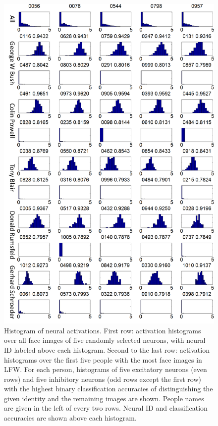 \documentclass[10pt,twocolumn,letterpaper]{article}
\begin{document}
\begin{figure}[t]
\begin{center}
\includegraphics[width=0.93\linewidth]{picture/24.png}
\end{center}
\vspace{-0.1in}
\caption{Histogram of neural activations. First row: activation histograms over all face images of five randomly selected neurons, with neural ID labeled above each histogram. Second to the last row: activation histograms over the first five people with the most face images in LFW. For each person, histograms of five excitatory neurons (even rows) and five inhibitory neurons (odd rows except the first row) with the highest binary classification accuracies of distinguishing the given identity and the remaining images are shown. People names are given in the left of every two rows. Neural ID and classification accuracies are shown above each histogram.}
\label{fig:acthista}
\vspace{-0.05in}
\end{figure}
\end{document}
